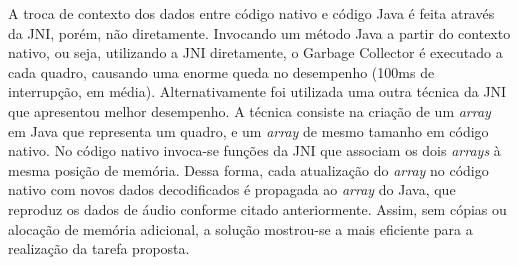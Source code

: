 \documentclass{acm_proc_article-sp}
\begin{document}

A troca de contexto dos dados entre código nativo e código Java é feita através da JNI, porém, não diretamente. Invocando um método Java a partir do contexto nativo, ou seja, utilizando a JNI diretamente, o Garbage Collector é executado a cada quadro, causando uma enorme queda no desempenho (100ms de interrupção, em média). Alternativamente foi utilizada uma outra técnica da JNI que apresentou melhor desempenho. A técnica consiste na criação de um \emph{array} em Java que representa um quadro, e um \emph{array} de mesmo tamanho em código nativo. No código nativo invoca-se funções da JNI que associam os dois \emph{arrays} à mesma posição de memória. Dessa forma, cada atualização do \emph{array} no código nativo com novos dados decodificados é propagada ao \emph{array} do Java, que reproduz os dados de áudio conforme citado anteriormente. Assim, sem cópias ou alocação de memória adicional, a solução mostrou-se a mais eficiente para a realização da tarefa proposta.
\end{document}
